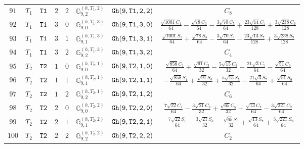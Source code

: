 \documentclass[fleqn,8pt]{jsarticle}
\begin{document}
\begin{table}[ht!]
\begin{center}
\begin{tabular}{cccccccc}
$ 91 $ & $ T_{1} $ & $ {\tt T1} $ & $ 2 $ & $ 2 $ & $ \mathbb{G}_{9,2}^{(h,T_{1},2)} $ & $ {\tt Gh(9,T1,2,2)} $ & $ C_{8} $ \\
$ 92 $ & $ T_{1} $ & $ {\tt T1} $ & $ 3 $ & $ 0 $ & $ \mathbb{G}_{9,0}^{(h,T_{1},3)} $ & $ {\tt Gh(9,T1,3,0)} $ & $ \frac{\sqrt{1001} C_{1}}{64} - \frac{\sqrt{78} C_{3}}{64} - \frac{3 \sqrt{70} C_{5}}{64} + \frac{23 \sqrt{14} C_{7}}{128} + \frac{3 \sqrt{238} C_{9}}{128} $ \\
$ 93 $ & $ T_{1} $ & $ {\tt T1} $ & $ 3 $ & $ 1 $ & $ \mathbb{G}_{9,1}^{(h,T_{1},3)} $ & $ {\tt Gh(9,T1,3,1)} $ & $ \frac{\sqrt{1001} S_{1}}{64} + \frac{\sqrt{78} S_{3}}{64} - \frac{3 \sqrt{70} S_{5}}{64} - \frac{23 \sqrt{14} S_{7}}{128} + \frac{3 \sqrt{238} S_{9}}{128} $ \\
$ 94 $ & $ T_{1} $ & $ {\tt T1} $ & $ 3 $ & $ 2 $ & $ \mathbb{G}_{9,2}^{(h,T_{1},3)} $ & $ {\tt Gh(9,T1,3,2)} $ & $ C_{4} $ \\
$ 95 $ & $ T_{2} $ & $ {\tt T2} $ & $ 1 $ & $ 0 $ & $ \mathbb{G}_{9,0}^{(h,T_{2},1)} $ & $ {\tt Gh(9,T2,1,0)} $ & $ \frac{\sqrt{858} C_{1}}{64} + \frac{\sqrt{91} C_{3}}{32} - \frac{5 \sqrt{15} C_{5}}{32} - \frac{21 \sqrt{3} C_{7}}{64} - \frac{\sqrt{51} C_{9}}{64} $ \\
$ 96 $ & $ T_{2} $ & $ {\tt T2} $ & $ 1 $ & $ 1 $ & $ \mathbb{G}_{9,1}^{(h,T_{2},1)} $ & $ {\tt Gh(9,T2,1,1)} $ & $ - \frac{\sqrt{858} S_{1}}{64} + \frac{\sqrt{91} S_{3}}{32} + \frac{5 \sqrt{15} S_{5}}{32} - \frac{21 \sqrt{3} S_{7}}{64} + \frac{\sqrt{51} S_{9}}{64} $ \\
$ 97 $ & $ T_{2} $ & $ {\tt T2} $ & $ 1 $ & $ 2 $ & $ \mathbb{G}_{9,2}^{(h,T_{2},1)} $ & $ {\tt Gh(9,T2,1,2)} $ & $ C_{6} $ \\
$ 98 $ & $ T_{2} $ & $ {\tt T2} $ & $ 2 $ & $ 0 $ & $ \mathbb{G}_{9,0}^{(h,T_{2},2)} $ & $ {\tt Gh(9,T2,2,0)} $ & $ \frac{7 \sqrt{22} C_{1}}{64} - \frac{3 \sqrt{21} C_{3}}{32} + \frac{\sqrt{65} C_{5}}{32} + \frac{\sqrt{13} C_{7}}{64} - \frac{3 \sqrt{221} C_{9}}{64} $ \\
$ 99 $ & $ T_{2} $ & $ {\tt T2} $ & $ 2 $ & $ 1 $ & $ \mathbb{G}_{9,1}^{(h,T_{2},2)} $ & $ {\tt Gh(9,T2,2,1)} $ & $ - \frac{7 \sqrt{22} S_{1}}{64} - \frac{3 \sqrt{21} S_{3}}{32} - \frac{\sqrt{65} S_{5}}{32} + \frac{\sqrt{13} S_{7}}{64} + \frac{3 \sqrt{221} S_{9}}{64} $ \\
$ 100 $ & $ T_{2} $ & $ {\tt T2} $ & $ 2 $ & $ 2 $ & $ \mathbb{G}_{9,2}^{(h,T_{2},2)} $ & $ {\tt Gh(9,T2,2,2)} $ & $ C_{2} $ \\
 \hline \hline
\end{tabular}
\end{center}
\end{table}
\end{document}
